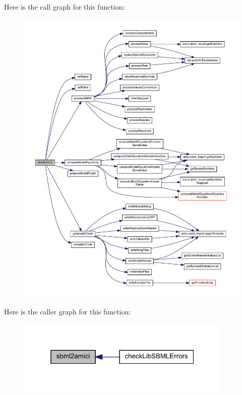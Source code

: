 Here is the call graph for this function\+:
\nopagebreak
\begin{figure}[H]
\begin{center}
\leavevmode
\includegraphics[width=350pt]{classamici_1_1sbml__import_1_1_sbml_importer_a83900bb62c0121eb798939a6d4232a9c_cgraph}
\end{center}
\end{figure}
Here is the caller graph for this function\+:
\nopagebreak
\begin{figure}[H]
\begin{center}
\leavevmode
\includegraphics[width=292pt]{classamici_1_1sbml__import_1_1_sbml_importer_a83900bb62c0121eb798939a6d4232a9c_icgraph}
\end{center}
\end{figure}
\mbox{\label{classamici_1_1sbml__import_1_1_sbml_importer_af9ec4a20beb62b41663733ecfc8e1713}} 
